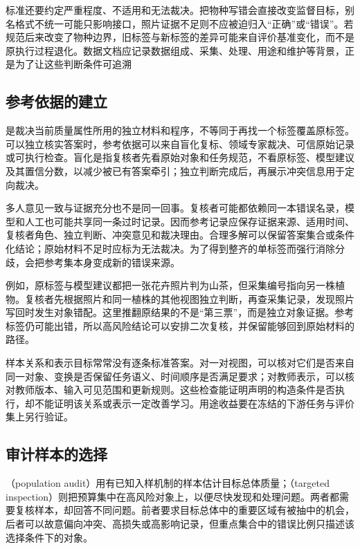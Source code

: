 标准还要约定严重程度、不适用和无法裁决。把物种写错会直接改变监督目标，别名格式不统一可能只影响接口，照片证据不足则不应被迫归入“正确”或“错误”。若规范后来改变了物种边界，旧标签与新标签的差异可能来自评价基准变化，而不是原执行过程退化。数据文档应记录数据组成、采集、处理、用途和维护等背景，正是为了让这些判断条件可追溯

\subsection{参考依据的建立}
\label{sec:knowledge-quality-assessment-correction-reference}

是裁决当前质量属性所用的独立材料和程序，不等同于再找一个标签覆盖原标签。可以独立核实答案时，参考依据可以来自盲化复标、领域专家裁决、可信原始记录或可执行检查。盲化是指复核者先看原始对象和任务规范，不看原标签、模型建议及其置信分数，以减少被已有答案牵引；独立判断完成后，再展示冲突信息用于定向裁决。

多人意见一致与证据充分也不是同一回事。复核者可能都依赖同一本错误名录，模型和人工也可能共享同一条过时记录。因而参考记录应保存证据来源、适用时间、复核者角色、独立判断、冲突意见和裁决理由。合理多解可以保留答案集合或条件化结论；原始材料不足时应标为无法裁决。为了得到整齐的单标签而强行消除分歧，会把参考集本身变成新的错误来源。

例如，原标签与模型建议都把一张花卉照片判为山茶，但采集编号指向另一株植物。复核者先根据照片和同一植株的其他视图独立判断，再查采集记录，发现照片写回时发生对象错配。这里推翻原结果的不是“第三票”，而是独立对象证据。参考标签仍可能出错，所以高风险结论可以安排二次复核，并保留能够回到原始材料的路径。

样本关系和表示目标常常没有逐条标准答案。对一对视图，可以核对它们是否来自同一对象、变换是否保留任务语义、时间顺序是否满足要求；对教师表示，可以核对教师版本、输入可见范围和更新规则。这些检查能证明声明的构造条件是否执行，却不能证明该关系或表示一定改善学习。用途收益要在冻结的下游任务与评价集上另行验证。

\subsection{审计样本的选择}
\label{sec:knowledge-quality-assessment-correction-sampling}

（population audit）用有已知入样机制的样本估计目标总体质量；（targeted inspection）则把预算集中在高风险对象上，以便尽快发现和处理问题。两者都需要复核样本，却回答不同问题。前者要求目标总体中的重要区域有被抽中的机会，后者可以故意偏向冲突、高损失或高影响记录，但重点集合中的错误比例只描述该选择条件下的对象。


